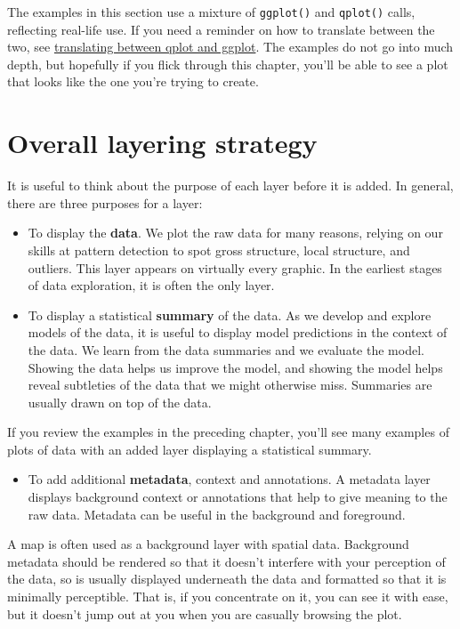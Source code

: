 The examples in this section use a mixture of \texttt{ggplot()} and
\texttt{qplot()} calls, reflecting real-life use. If you need a reminder
on how to translate between the two, see
\hyperref[sec:qplot-ggplot]{translating between qplot and ggplot}. The
examples do not go into much depth, but hopefully if you flick through
this chapter, you'll be able to see a plot that looks like the one
you're trying to create.

\section{Overall layering strategy}\label{sec:strategy}

It is useful to think about the purpose of each layer before it is
added. In general, there are three purposes for a layer:

\begin{itemize}
\itemsep1pt\parskip0pt
\item
  To display the \textbf{data}. We plot the raw data for many reasons,
  relying on our skills at pattern detection to spot gross structure,
  local structure, and outliers. This layer appears on virtually every
  graphic. In the earliest stages of data exploration, it is often the
  only layer.
\item
  To display a statistical \textbf{summary} of the data. As we develop
  and explore models of the data, it is useful to display model
  predictions in the context of the data. We learn from the data
  summaries and we evaluate the model. Showing the data helps us improve
  the model, and showing the model helps reveal subtleties of the data
  that we might otherwise miss. Summaries are usually drawn on top of
  the data.
\end{itemize}

If you review the examples in the preceding chapter, you'll see many
examples of plots of data with an added layer displaying a statistical
summary.

\begin{itemize}
\itemsep1pt\parskip0pt
\item
  To add additional \textbf{metadata}, context and annotations. A
  metadata layer displays background context or annotations that help to
  give meaning to the raw data. Metadata can be useful in the background
  and foreground.
\end{itemize}

A map is often used as a background layer with spatial data. Background
metadata should be rendered so that it doesn't interfere with your
perception of the data, so is usually displayed underneath the data and
formatted so that it is minimally perceptible. That is, if you
concentrate on it, you can see it with ease, but it doesn't jump out at
you when you are casually browsing the plot.

